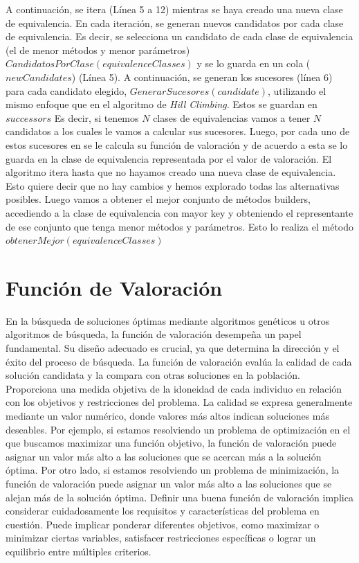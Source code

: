 A continuación, se itera (Línea 5 a 12) mientras se haya creado una nueva clase de equivalencia. En cada iteración, se generan nuevos candidatos por cada clase de equivalencia. Es decir, se selecciona un candidato de cada clase de equivalencia (el de menor métodos y menor parámetros) $CandidatosPorClase(equivalenceClasses)$ y se lo guarda en un cola ($newCandidates$) (Línea 5). A continuación, se generan los sucesores (línea 6) para cada candidato elegido, $GenerarSucesores(candidate)$, utilizando el mismo enfoque que en el algoritmo de \emph{Hill Climbing}. Estos se guardan en $successors$ Es decir, si tenemos $N$ clases de equivalencias vamos a tener $N$ candidatos a los cuales le vamos a calcular sus sucesores.  Luego, por cada uno de estos sucesores en  se le calcula su función de valoración y de acuerdo a esta se lo guarda en la clase de equivalencia representada por el valor de valoración.
El algoritmo itera hasta que no hayamos creado una nueva clase de equivalencia. Esto quiere decir que no hay cambios y hemos explorado todas las alternativas posibles. 
Luego vamos a obtener el mejor conjunto de métodos builders, accediendo a la clase de equivalencia con mayor key y obteniendo el representante de ese conjunto que tenga menor métodos y parámetros. Esto lo realiza el método $obtenerMejor(equivalenceClasses)$



\section{Función de Valoración}
\label{sec:fitness}


En la búsqueda de soluciones óptimas mediante algoritmos genéticos u otros algoritmos de búsqueda, la función de valoración \cite{goldberg1989genetic} desempeña un papel fundamental. Su diseño adecuado es crucial, ya que determina la dirección y el éxito del proceso de búsqueda.
La función de valoración evalúa la calidad de cada solución candidata y la compara con otras soluciones en la población. Proporciona una medida objetiva de la idoneidad de cada individuo en relación con los objetivos y restricciones del problema. La calidad se expresa generalmente mediante un valor numérico, donde valores más altos indican soluciones más deseables. Por ejemplo, si estamos resolviendo un problema de optimización en el que buscamos maximizar una función objetivo, la función de valoración puede asignar un valor más alto a las soluciones que se acercan más a la solución óptima. Por otro lado, si estamos resolviendo un problema de minimización, la función de valoración puede asignar un valor más alto a las soluciones que se alejan más de la solución óptima.
Definir una buena función de valoración implica considerar cuidadosamente los requisitos y características del problema en cuestión. Puede implicar ponderar diferentes objetivos, como maximizar o minimizar ciertas variables, satisfacer restricciones específicas o lograr un equilibrio entre múltiples criterios. 

